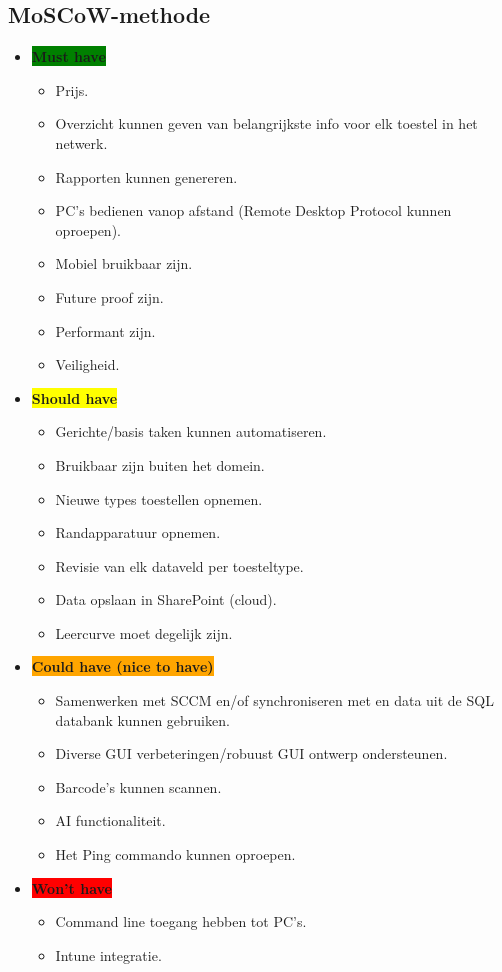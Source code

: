 \subsection{MoSCoW-methode}

\begin{itemize}
    \item \textbf{\colorbox{green}{Must have}}
    \begin{itemize}
        \item Prijs.
        \item Overzicht kunnen geven van belangrijkste info voor elk toestel in het netwerk.
        \item Rapporten kunnen genereren.
        \item PC's bedienen vanop afstand (Remote Desktop Protocol kunnen oproepen).
        \item Mobiel bruikbaar zijn.
        \item Future proof zijn.
        \item Performant zijn.
        \item Veiligheid.
        
    \end{itemize}
    \item \textbf{\colorbox{yellow}{Should have}}
    \begin{itemize}
        \item Gerichte/basis taken kunnen automatiseren.
        \item Bruikbaar zijn buiten het domein.
        \item Nieuwe types toestellen opnemen.
        \item Randapparatuur opnemen.
        \item Revisie van elk dataveld per toesteltype.
        \item Data opslaan in SharePoint (cloud).
        \item Leercurve moet degelijk zijn.
    \end{itemize}
    \item \textbf{\colorbox{orange}{Could have (nice to have)}}
    \begin{itemize}
        \item Samenwerken met SCCM en/of synchroniseren met en data uit de SQL databank kunnen gebruiken.
        \item Diverse GUI verbeteringen/robuust GUI ontwerp ondersteunen.
        \item Barcode's kunnen scannen.
        \item AI functionaliteit.
        \item Het Ping commando kunnen oproepen.
    \end{itemize}
    \item \textbf{\colorbox{red}{Won't have}}
    \begin{itemize}
        \item Command line toegang hebben tot PC's.
        \item Intune integratie.
    \end{itemize}
\end{itemize}

